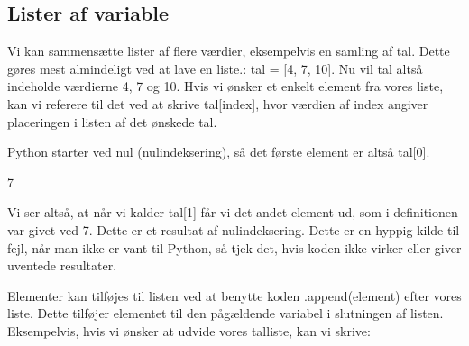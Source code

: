\documentclass[letterpaper,10pt,english]{jupyterBook}
\begin{document}
\subsection{Lister af variable}
\label{\detokenize{notebooks/Basal_python:lister-af-variable}}
Vi kan sammensætte lister af flere værdier, eksempelvis en samling af tal. Dette gøres mest almindeligt ved at lave en liste.:
tal = {[}4, 7, 10{]}. Nu vil tal altså indeholde værdierne 4, 7 og 10. Hvis vi ønsker et enkelt element fra vores liste, kan vi referere til det ved at skrive tal{[}index{]}, hvor værdien af index angiver placeringen i listen af det ønskede tal.

 Python starter ved nul (nul\sphinxhyphen{}indeksering), så det første element er altså tal{[}0{]}.

\begin{sphinxVerbatim}[commandchars=\\\{\}]
  \PYG{p}{[}  \PYG{p}{]}
\PYG{p}{[}\PYG{p}{]}
\end{sphinxVerbatim}

\begin{sphinxVerbatim}[commandchars=\\\{\}]
7
\end{sphinxVerbatim}

Vi ser altså, at når vi kalder tal{[}1{]} får vi det andet element ud, som i definitionen var givet ved 7. Dette er et resultat af nul\sphinxhyphen{}indeksering. Dette er en hyppig kilde til fejl, når man ikke er vant til Python, så tjek det, hvis koden ikke virker eller giver uventede resultater.

Elementer kan tilføjes til listen ved at benytte koden .append(element) efter vores liste. Dette tilføjer elementet til den pågældende variabel i slutningen af listen. Eksempelvis, hvis vi ønsker at udvide vores tal\sphinxhyphen{}liste, kan vi skrive:

\begin{sphinxVerbatim}[commandchars=\\\{\}]
\end{sphinxVerbatim}

\begin{sphinxVerbatim}[commandchars=\\\{\}]
[4, 7, 10, 6]
\end{sphinxVerbatim}
\end{document}
